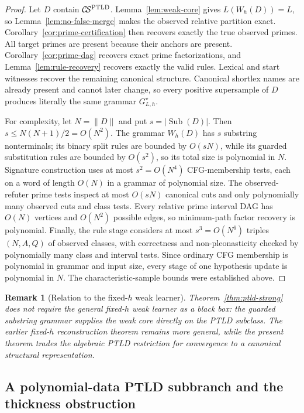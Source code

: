 \documentclass[11pt,a4paper]{article}
\newtheorem{remark}[theorem]{Remark}
\newcommand{\CS}{\mathcal{C}\!\mathcal{S}}
\begin{document}
\begin{proof}
Let $D$ contain $\CS^{\rm PTLD}$.  Lemma~\ref{lem:weak-core} gives $L(W_h(D))=L$, so Lemma~\ref{lem:no-false-merge} makes the observed relative partition exact.  Corollary~\ref{cor:prime-certification} then recovers exactly the true observed primes.  All target primes are present because their anchors are present.  Corollary~\ref{cor:prime-dag} recovers exact prime factorizations, and Lemma~\ref{lem:rule-recovery} recovers exactly the valid rules.  Lexical and start witnesses recover the remaining canonical structure.  Canonical shortlex names are already present and cannot later change, so every positive supersample of $D$ produces literally the same grammar $G^\star_{L,h}$.

For complexity, let $N=\|D\|$ and put $s=|\operatorname{Sub}(D)|$.  Then $s\le N(N+1)/2=O(N^2)$.  The grammar $W_h(D)$ has $s$ substring nonterminals; its binary split rules are bounded by $O(sN)$, while its guarded substitution rules are bounded by $O(s^2)$, so its total size is polynomial in $N$.  Signature construction uses at most $s^2=O(N^4)$ CFG-membership tests, each on a word of length $O(N)$ in a grammar of polynomial size.  The observed-refuter prime tests inspect at most $O(sN)$ canonical cuts and only polynomially many observed cuts and class tests.  Every relative prime interval DAG has $O(N)$ vertices and $O(N^2)$ possible edges, so minimum-path factor recovery is polynomial.  Finally, the rule stage considers at most $s^3=O(N^6)$ triples $(N,A,Q)$ of observed classes, with correctness and non-pleonasticity checked by polynomially many class and interval tests.  Since ordinary CFG membership is polynomial in grammar and input size, every stage of one hypothesis update is polynomial in $N$.  The characteristic-sample bounds were established above.
\end{proof}

\begin{remark}[Relation to the fixed-$h$ weak learner]
Theorem~\ref{thm:ptld-strong} does not require the general fixed-$h$ weak learner as a black box: the guarded substring grammar supplies the weak core directly on the PTLD subclass.  The earlier fixed-$h$ reconstruction theorem remains more general, while the present theorem trades the algebraic PTLD restriction for convergence to a canonical structural representation.
\end{remark}

\subsection{A polynomial-data PTLD subbranch and the thickness obstruction}
\end{document}

